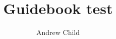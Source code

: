 \documentclass[10pt]{report}
\begin{document}
\title{Guidebook test}
\author{Andrew Child}
\date{}
\maketitle

\newcommand\chapterColor{MidnightBlue}

\twocolumn
\renewcommand\chapterColor{BrickRed}

\end{document}
